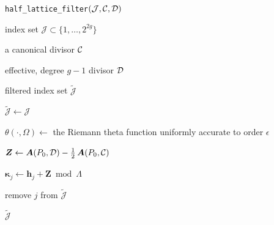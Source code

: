 \begin{algorithm}[t]
\caption{{\tt half\_lattice\_filter}$(\mathcal{J},\operatorname{\mathcal{C}},\operatorname{\mathcal{D}})$}
\label{alg:half-lattice-filter}
\begin{algorithmic}[1]

  \Require index set $\mathcal{J} \subset \{1, \ldots, 2^{2g}\}$

  \Require a canonical divisor $\operatorname{\mathcal{C}}$

  \Require effective, degree $g-1$ divisor $\operatorname{\mathcal{D}}$

  \Ensure filtered index set $\tilde{\mathcal{J}}$

  \State $\tilde{\mathcal{J}} \gets \mathcal{J}$

  \State $\theta( \cdot, \Omega) \gets$ the Riemann theta function
  uniformly accurate to order $\epsilon$

  \State $\boldsymbol{Z} \gets \operatorname{\boldsymbol{A}}(P_0,\operatorname{\mathcal{D}}) - \tfrac{1}{2}
  \operatorname{\boldsymbol{A}}(P_0,\operatorname{\mathcal{C}})$


      \State $\boldsymbol{\kappa}_j \gets \boldsymbol{h}_j + \boldsymbol{Z}
      \bmod{\Lambda}$


          \State remove $j$ from $\tilde{\mathcal{J}}$

      \EndIf

  \EndFor

  \State \Return $\tilde{\mathcal{J}}$

\end{algorithmic}
\end{algorithm}

